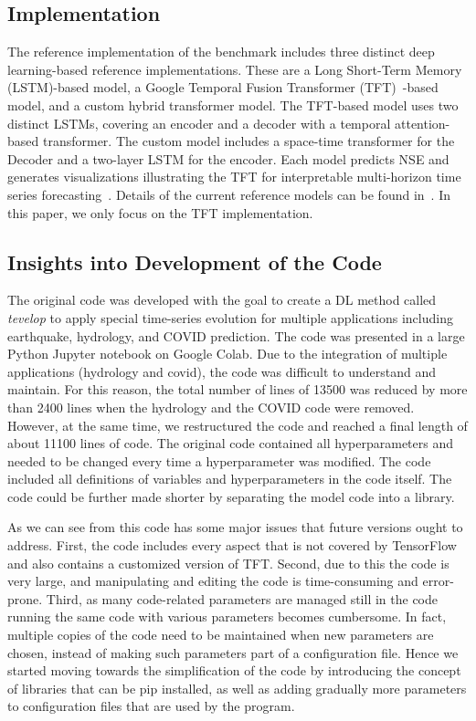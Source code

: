 \documentclass[utf8]{FrontiersinVancouver} %
\begin{document}
\subsection{Implementation}

The reference implementation of the benchmark includes three distinct
deep learning-based reference implementations. These are a Long
Short-Term Memory (LSTM)-based model, a Google Temporal Fusion
Transformer (TFT)~\citep{TFT-21}-based model, and a custom hybrid
transformer model. The TFT-based model uses two distinct LSTMs,
covering an encoder and a decoder with a temporal attention-based
transformer. The custom model includes a space-time transformer for
the Decoder and a two-layer LSTM for the encoder. Each model predicts
NSE and generates visualizations illustrating the TFT for
interpretable multi-horizon time series
forecasting~\citep{TFT-21}. Details of the current reference models
can be found in~\citep{fox2022-jm}.  In this paper, we only focus on
the TFT implementation.

\subsection{Insights into Development of the Code}

The original code was developed with the goal to create a DL method
called {\em tevelop} to apply special time-series evolution for
multiple applications including earthquake, hydrology, and COVID
prediction. The code was presented in a large Python Jupyter notebook
on Google Colab.  Due to the integration of multiple applications
(hydrology and covid), the code was difficult to understand and
maintain. For this reason, the total number of lines of 13500 was
reduced by more than 2400 lines when the hydrology and the COVID code
were removed. However, at the same time, we restructured the code and
reached a final length of about 11100 lines of code. The original
code contained all hyperparameters and needed to be changed every time
a hyperparameter was modified. The code included all definitions of
variables and hyperparameters in the code itself. The code could be
further made shorter by separating the model code into a library.

As we can see from this code has some major issues that future
versions ought to address. First, the code includes every aspect that
is not covered by TensorFlow and also contains a customized version of
TFT. Second, due to this the code is very large, and manipulating and
editing the code is time-consuming and error-prone. Third, as many
code-related parameters are managed still in the code running the same
code with various parameters becomes cumbersome. In fact, multiple
copies of the code need to be maintained when new parameters are
chosen, instead of making such parameters part of a configuration
file. Hence we started moving towards the simplification of the code
by introducing the concept of libraries that can be pip installed, as
well as adding gradually more parameters to configuration files that
are used by the program.
\end{document}
